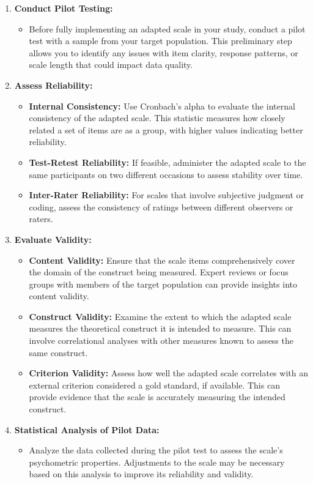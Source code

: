 \documentclass[
]{book}
\providecommand{\tightlist}{%
  \setlength{\itemsep}{0pt}\setlength{\parskip}{0pt}}
\begin{document}
\begin{enumerate}
\def\labelenumi{\arabic{enumi}.}
\tightlist
\item
  \textbf{Conduct Pilot Testing:}

  \begin{itemize}
  \tightlist
  \item
    Before fully implementing an adapted scale in your study, conduct a pilot test with a sample from your target population. This preliminary step allows you to identify any issues with item clarity, response patterns, or scale length that could impact data quality.
  \end{itemize}
\item
  \textbf{Assess Reliability:}

  \begin{itemize}
  \tightlist
  \item
    \textbf{Internal Consistency:} Use Cronbach's alpha to evaluate the internal consistency of the adapted scale. This statistic measures how closely related a set of items are as a group, with higher values indicating better reliability.
  \item
    \textbf{Test-Retest Reliability:} If feasible, administer the adapted scale to the same participants on two different occasions to assess stability over time.
  \item
    \textbf{Inter-Rater Reliability:} For scales that involve subjective judgment or coding, assess the consistency of ratings between different observers or raters.
  \end{itemize}
\item
  \textbf{Evaluate Validity:}

  \begin{itemize}
  \tightlist
  \item
    \textbf{Content Validity:} Ensure that the scale items comprehensively cover the domain of the construct being measured. Expert reviews or focus groups with members of the target population can provide insights into content validity.
  \item
    \textbf{Construct Validity:} Examine the extent to which the adapted scale measures the theoretical construct it is intended to measure. This can involve correlational analyses with other measures known to assess the same construct.
  \item
    \textbf{Criterion Validity:} Assess how well the adapted scale correlates with an external criterion considered a gold standard, if available. This can provide evidence that the scale is accurately measuring the intended construct.
  \end{itemize}
\item
  \textbf{Statistical Analysis of Pilot Data:}

  \begin{itemize}
  \tightlist
  \item
    Analyze the data collected during the pilot test to assess the scale's psychometric properties. Adjustments to the scale may be necessary based on this analysis to improve its reliability and validity.
  \end{itemize}
\end{enumerate}
\end{document}
